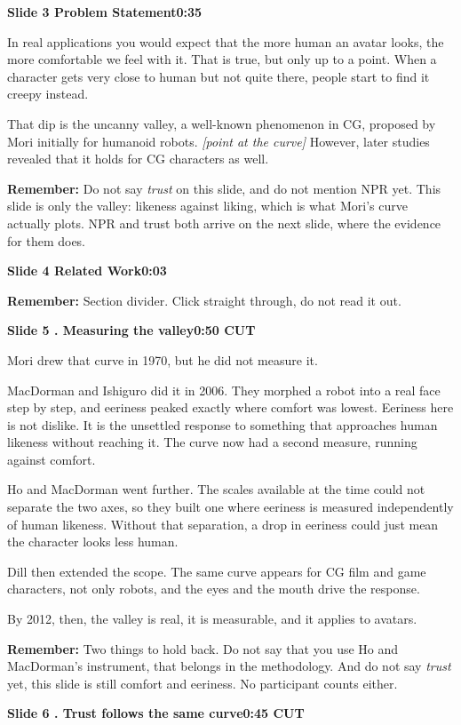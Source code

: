 \documentclass[11pt,a4paper]{article}
\newcommand{\slidehead}[3]{%
  \needspace{5\baselineskip}
  \vspace{0.9em}
  \noindent\colorbox{knblue}{\parbox{0.978\textwidth}{\vspace{1pt}\color{white}\textbf{Slide #1 \quad #2}\hfill\textbf{#3}\vspace{1pt}}}
  \vspace{0.35em}\par}
\newcommand{\remind}[1]{%
  \vspace{0.15em}
  \noindent\colorbox{knlight}{\parbox{0.972\textwidth}{\small\color{knblue}\textbf{Remember:} #1}}
  \vspace{0.2em}\par}
\newcommand{\pointto}[1]{{\color{knaccent}\textit{[#1]}}}
\begin{document}
\slidehead{3}{Problem Statement}{0:35}

In real applications you would expect that the more human an avatar looks, the more comfortable we feel with it. That is true, but only up to a point. When a character gets very close to human but not quite there, people start to find it creepy instead.

That dip is the uncanny valley, a well-known phenomenon in CG, proposed by Mori initially for humanoid robots. \pointto{point at the curve} However, later studies revealed that it holds for CG characters as well.

\remind{Do not say \emph{trust} on this slide, and do not mention NPR yet. This slide is only the valley: likeness against liking, which is what Mori's curve actually plots. NPR and trust both arrive on the next slide, where the evidence for them does.}

\slidehead{4}{Related Work}{0:03}

\remind{Section divider. Click straight through, do not read it out.}

\slidehead{5}{1. Measuring the valley}{0:50 \quad CUT}

Mori drew that curve in 1970, but he did not measure it.

MacDorman and Ishiguro did it in 2006. They morphed a robot into a real face step by step, and eeriness peaked exactly where comfort was lowest. Eeriness here is not dislike. It is the unsettled response to something that approaches human likeness without reaching it. The curve now had a second measure, running against comfort.

Ho and MacDorman went further. The scales available at the time could not separate the two axes, so they built one where eeriness is measured independently of human likeness. Without that separation, a drop in eeriness could just mean the character looks less human.

Dill then extended the scope. The same curve appears for CG film and game characters, not only robots, and the eyes and the mouth drive the response.

By 2012, then, the valley is real, it is measurable, and it applies to avatars.

\remind{Two things to hold back. Do not say that you use Ho and MacDorman's instrument, that belongs in the methodology. And do not say \emph{trust} yet, this slide is still comfort and eeriness. No participant counts either.}

\slidehead{6}{2. Trust follows the same curve}{0:45 \quad CUT}
\end{document}
